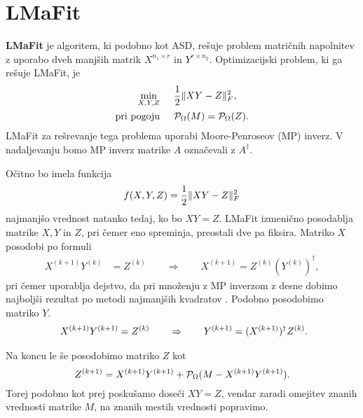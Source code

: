 \section{LMaFit} \label{2807-1447}
\textbf{LMaFit} \cite{LMaFit-WY12} je algoritem, ki podobno kot ASD, rešuje problem matričnih napolnitev z uporabo dveh manjših matrik $X^{n_1 \times r}$ in $Y^{r \times n_2}$.
Optimizacijski problem, ki ga rešuje LMaFit, je
\begin{align*}
    \min_{X, Y, Z}& \hspace{0.5cm} \frac{1}{2}\lVert XY - Z\rVert_F^2,\\
    \text{pri pogoju}& \hspace{0.5cm} \mathcal{P}_\Omega(M) = \mathcal{P}_\Omega(Z).
\end{align*}
LMaFit za rešrevanje tega problema uporabi
Moore-Penroseov (MP) inverz. V nadaljevanju bomo MP inverz matrike $A$ označevali z $A^\dagger$.

Očitno bo imela funkcija 
$$f(X,Y,Z) = \frac{1}{2}\lVert XY - Z\rVert_F^2$$ najmanjšo vrednost natanko tedaj, ko bo $XY = Z$. 
LMaFit izmenično posodablja matrike $X, Y$ in $Z$, pri čemer eno spreminja, preostali dve pa fiksira. Matriko $X$ posodobi po formuli
\begin{align*}
    X^{(k+1)}Y^{(k)}&= Z^{(k)}
    \qquad 
    \Rightarrow
    \qquad
    X^{(k+1)} = Z^{(k)}(Y^{(k)})^\dagger,
\end{align*}
pri čemer uporablja dejstvo, da pri množenju z MP inverzom z desne 
dobimo najboljši rezultat po metodi najmanjših kvadratov \cite[pogl. 3]{demmel97}.
Podobno posodobimo matriko $Y$.
\begin{align*}
    \hspace{0.5cm} X^{(k+1)}Y^{(k+1)} &= Z^{(k)}    \qquad 
    \Rightarrow
    \qquad
    Y^{(k+1)} = (X^{(k+1)})^\dagger Z^{(k)}.
\end{align*}

Na koncu le še posodobimo matriko $Z$ kot
\[
    Z^{(k+1)} = X^{(k+1)}Y^{(k+1)} + \mathcal{P}_\Omega(M - X^{(k+1)}Y^{(k+1)}).
\]
Torej podobno kot prej poskušamo doseči $XY = Z$, vendar zaradi omejitev znanih vrednosti matrike $M$, na znanih mestih vrednosti popravimo.
